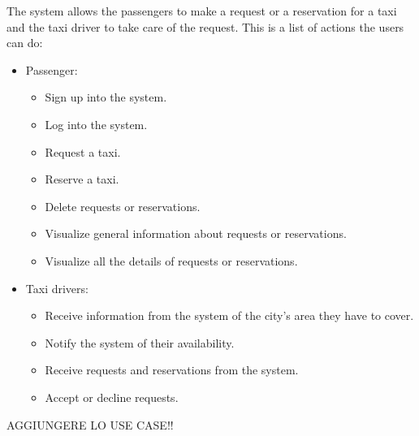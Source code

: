 The system allows the passengers to make a request or a reservation for a taxi and the taxi driver to take care of the request.
This is a list of actions the users can do:

\begin{itemize}
    \item Passenger:
        \begin{itemize}
        	\item Sign up into the system.
        	\item Log into the system.
        	\item Request a taxi.
        	\item Reserve a taxi.
        	\item Delete requests or reservations.
        	\item Visualize general information about requests or reservations.
        	\item Visualize all the details of requests or reservations.
        \end{itemize}
    \item Taxi drivers:
        \begin{itemize}
        	\item Receive information from the system of the city's area they have to cover.
        	\item Notify the system of their availability.
        	\item Receive requests and reservations from the system.
        	\item Accept or decline requests.
        \end{itemize}
\end{itemize}

AGGIUNGERE LO USE CASE!!